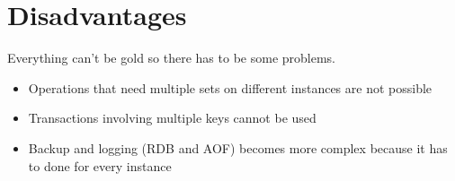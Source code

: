 \section{Disadvantages}
Everything can't be gold so there has to be some problems.
\begin{itemize}
	\item Operations that need multiple sets on different instances are not possible
	\item Transactions involving multiple keys cannot be used
	\item Backup and logging (RDB and AOF) becomes more complex because it has to done for every instance
\end{itemize}